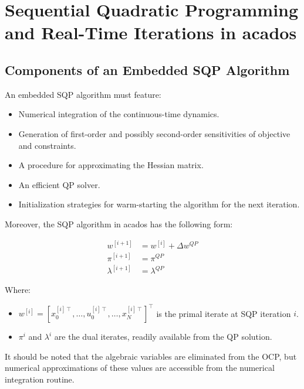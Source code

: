\documentclass{thesisreport}
\begin{document}
\chapter{Sequential Quadratic Programming and Real-Time Iterations in acados}\label{appendix_acados}

\section{Components of an Embedded SQP Algorithm}

    An embedded SQP algorithm must feature: 
    \begin{itemize}
        \item Numerical integration of the continuous-time dynamics.
        \item Generation of first-order and possibly second-order sensitivities of objective and constraints.
        \item A procedure for approximating the Hessian matrix.
        \item An efficient QP solver.
        \item Initialization strategies for warm-starting the algorithm for the next iteration.
    \end{itemize}

Moreover, the SQP algorithm in acados has the following form:

\begin{align}
	 w^{[i+1]} &=w^{[i]} + \Delta w^{QP}\\
     \pi^{[i+1]} &= \pi^{QP} \\
     \lambda^{[i+1]} &= \lambda^{QP}
\end{align}


Where:
\begin{itemize}
    \item $ w^{[i]} = [x_0^{[i] \intercal}, \ldots, u_0^{[i] \intercal}, \ldots, x_N^{[i] \intercal}]^{\intercal}$ is the primal iterate at SQP iteration $i$.
    \item $\pi^i$ and $\lambda^i$ are the dual iterates, readily available from the QP solution.
\end{itemize}

It should be noted that the algebraic variables are eliminated from the OCP, but numerical approximations of these values are accessible from the numerical integration routine.
\end{document}
